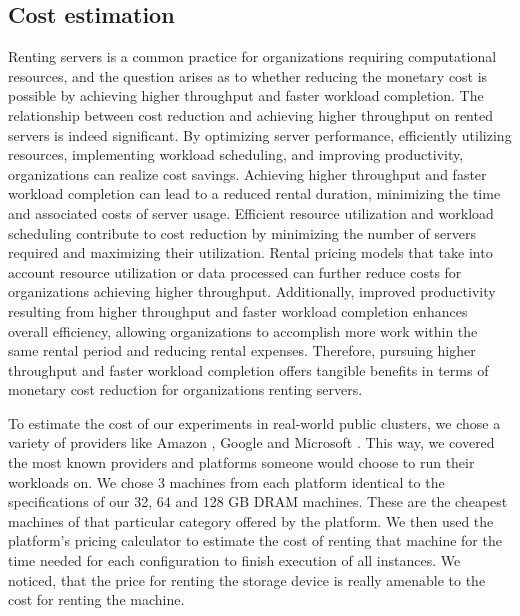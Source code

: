 \subsection{Cost estimation}
Renting servers is a common practice for organizations requiring
computational resources, and the question arises as to whether
reducing the monetary cost is possible by achieving higher throughput
and faster workload completion. The relationship between cost
reduction and achieving higher throughput on rented servers is indeed
significant. By optimizing server performance, efficiently utilizing
resources, implementing workload scheduling, and improving
productivity, organizations can realize cost savings. Achieving higher
throughput and faster workload completion can lead to a reduced rental
duration, minimizing the time and associated costs of server usage.
Efficient resource utilization and workload scheduling contribute to
cost reduction by minimizing the number of servers required and
maximizing their utilization. Rental pricing models that take into
account resource utilization or data processed can further reduce
costs for organizations achieving higher throughput. Additionally,
improved productivity resulting from higher throughput and faster
workload completion enhances overall efficiency, allowing
organizations to accomplish more work within the same rental period
and reducing rental expenses. Therefore, pursuing higher throughput
and faster workload completion offers tangible benefits in terms of
monetary cost reduction for organizations renting servers. 

To estimate the cost of our experiments in real-world public clusters, we
chose a variety of providers like Amazon \cite{EC2}, Google \cite{GCP} and Microsoft \cite{Azure}. This
way, we covered the most known providers and platforms someone would
choose to run their workloads on. We chose 3 machines from each
platform identical to the specifications of our 32, 64 and 128 GB DRAM
machines. These are the cheapest machines of that particular category
offered by the platform. We then used the platform's pricing
calculator to estimate the cost of renting that machine for the time
needed for each configuration to finish execution of all instances. We noticed, that the price for
renting the storage device is really amenable to the cost for renting the machine.
%
